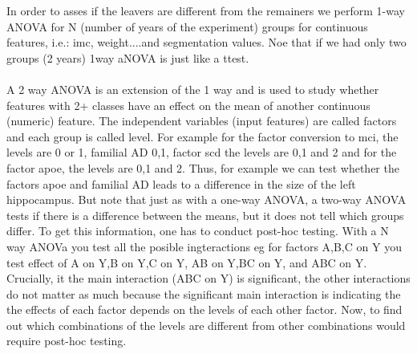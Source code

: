 \documentclass[11pt]{article}
\theoremstyle{definition}
\theoremstyle{remark}
\begin{document}
In order to asses if the leavers are different from the remainers we perform 1-way ANOVA for N (number of years of the experiment) groups for continuous features, i.e.: imc, weight....and segmentation values.
Noe that if we had only two groups (2 years) 1way aNOVA is just like a ttest.

\paragraph*{}

A 2 way ANOVA is an extension of the 1 way and is used to study whether features with 2+ classes have an effect on the mean of another continuous (numeric) feature. The independent variables (input features) are called factors and each group is called level.
For example for the factor conversion to mci, the levels are 0 or 1, familial AD 0,1, factor scd the levels are 0,1 and 2 and for the factor apoe, the levels are 0,1 and 2. Thus, for example we can test whether the factors apoe and familial AD leads to a difference in the size of the left hippocampus.
But note that just as with a one-way ANOVA, a two-way ANOVA tests if there is a difference between the means, but it does not tell which groups differ. To get this information, one has to conduct post-hoc testing.
With a N way ANOVa you test all the posible ingteractions eg for factors A,B,C on Y you test effect of A on Y,B on Y,C on Y, AB on Y,BC on Y, and ABC on Y.
Crucially, it the main interaction (ABC on Y) is significant, the other interactions do not matter as much because the significant main interaction is indicating the the effects of each factor depends on the levels of each other factor. Now, to find out which combinations of the levels are different from other combinations would require post-hoc testing.    
\end{document}
